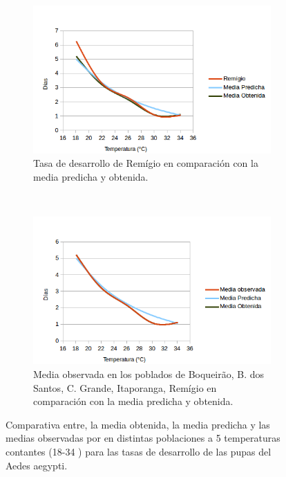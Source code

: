 \begin{figure}[!htbp]
\begin{subfigure}[b]{0.45\textwidth}
    \end{subfigure}
    \begin{subfigure}[t]{0.45\textwidth}
            \includegraphics[width=\textwidth]{capitulo-6/graphics/desarrollo-pupa-5.png}
            \caption{Tasa de desarrollo de Remígio en comparación con la media predicha y obtenida.}
    \end{subfigure}
    ~~~~
    \begin{subfigure}[t]{0.45\textwidth}
            \includegraphics[width=\textwidth]{capitulo-6/graphics/desarrollo-pupa-6.png}
            \caption{Media observada en los poblados de Boqueirão, B. dos Santos, C. Grande, Itaporanga, Remígio en comparación con la media predicha y obtenida.}

    \end{subfigure}

    \caption{\label{fig:desarrollo-pupa-baserra2006}
    Comparativa entre, la media obtenida, la media predicha y las medias observadas por \cite{
    BESERRA2006} en distintas poblaciones a 5 temperaturas contantes (18-34 \textcelsius) para
    las tasas de desarrollo de las pupas del Aedes aegypti.}
\end{figure}
